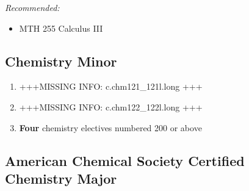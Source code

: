 \documentclass[
  letterpaper,
]{scrbook}
\providecommand{\tightlist}{%
  \setlength{\itemsep}{0pt}\setlength{\parskip}{0pt}}
\begin{document}
\emph{Recommended:}

\begin{itemize}
\tightlist
\item
  MTH 255 Calculus III
\end{itemize}

\subsection{Chemistry Minor}\label{chemistry-minor}

\begin{enumerate}
\def\labelenumi{\arabic{enumi}.}
\item
  +++MISSING INFO: c.chm121\_121l.long +++
\item
  +++MISSING INFO: c.chm122\_122l.long +++
\item
  \textbf{Four} chemistry electives numbered 200 or above
\end{enumerate}

\subsection{American Chemical Society Certified Chemistry
Major}\label{american-chemical-society-certified-chemistry-major}
\end{document}
